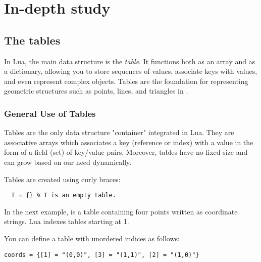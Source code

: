 \newpage

\section{In-depth study} %
\label{sec:in_depth_study}

\subsection{The tables} %
\label{sub:the_tables}

In Lua, the main data structure is the \emph{table}. It functions both as an array and as a dictionary, allowing you to store sequences of values, associate keys with values, and even represent complex objects. Tables are the foundation for representing geometric structures such as points, lines, and triangles in .


\subsubsection{General Use of Tables} %
\label{ssub:general_tables}
Tables are the only data structure "container" integrated in Lua. 
 They are associative arrays  which associates a key (reference or index) with a value in the form of a field (set) of key/value pairs. Moreover, tables have no fixed size and can grow based on our need dynamically.

Tables are created using curly braces:

\begin{mybox}
\begin{verbatim}
  T = {} % T is an empty table.
\end{verbatim}
\end{mybox}

In the next example,  is a table containing four points written as coordinate strings. Lua indexes tables starting at 1.

\begin{tkzexample}[latex=0.35\textwidth]
\end{tkzexample}

You can define a table with unordered indices as follows:

\begin{mybox}
\begin{verbatim}
coords = {[1] = "(0,0)", [3] = "(1,1)", [2] = "(1,0)"}
\end{verbatim}
\end{mybox}

